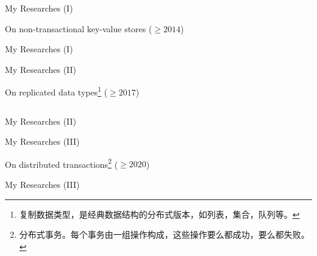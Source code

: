\begin{frame}{My Researches (I)}
	\begin{center}

		On non-transactional key-value stores ($\ge 2014$) \\[6pt]

	\end{center}
\end{frame}

\begin{frame}{My Researches (I)}

	\vspace{0.30cm}

	\vspace{0.30cm}
\end{frame}

\begin{frame}{My Researches (II)}
	\begin{center}
		On replicated data types\footnote{复制数据类型，是经典数据结构的分布式版本，如列表，集合，队列等。} ($\ge 2017$) \\[6pt]

		\begin{columns}[c]
		\end{columns}
	\end{center}
\end{frame}

\begin{frame}{My Researches (II)}

	\vspace{0.30cm}

	\vspace{0.30cm}

	\vspace{0.30cm}
\end{frame}

\begin{frame}{My Researches (III)}
	\begin{center}
		On distributed transactions\footnote{
			分布式事务。每个事务由一组操作构成，这些操作要么都成功，要么都失败。} ($\ge 2020$) \\[6pt]

	\end{center}
\end{frame}

\begin{frame}{My Researches (III)}
\end{frame}
